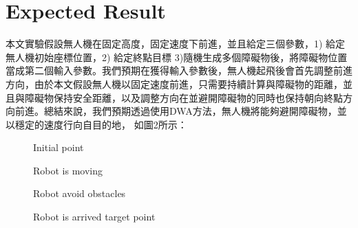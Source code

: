 \documentclass[crop=false]{standalone}
\begin{document}
	\section{Expected Result}
	本文實驗假設無人機在固定高度，固定速度下前進，並且給定三個參數，1) 給定無人機初始座標位置，2) 給定終點目標 3)隨機生成多個障礙物後，將障礙物位置當成第二個輸入參數。我們預期在獲得輸入參數後，無人機起飛後會首先調整前進方向，由於本文假設無人機以固定速度前進，只需要持續計算與障礙物的距離，並且與障礙物保持安全距離，以及調整方向在並避開障礙物的同時也保持朝向終點方向前進。總結來說，我們預期透過使用DWA方法，無人機將能夠避開障礙物，並以穩定的速度行向自目的地， 如圖2所示：   
    
    \begin{figure}[htbp]	
    	\centering
    	\begin{minipage}{0.49\linewidth}
    		\centering
    		\caption{Initial point}
    		\label{Initial robot point}%
    	\end{minipage}
    	\begin{minipage}{0.49\linewidth}
    		\centering
    		\caption{Robot is moving}
    		\label{Moving robot}%
    	\end{minipage}
    	
    	\begin{minipage}{0.49\linewidth}
    		\centering
    		\caption{Robot avoid obstacles}
    		\label{Robot avoid obstacles}%
    	\end{minipage}
    	\begin{minipage}{0.49\linewidth}
    		\centering
    		\caption{Robot is arrived target point}
    		\label{Robot is arrived target point}%
    	\end{minipage}

    \end{figure}
\end{document}
